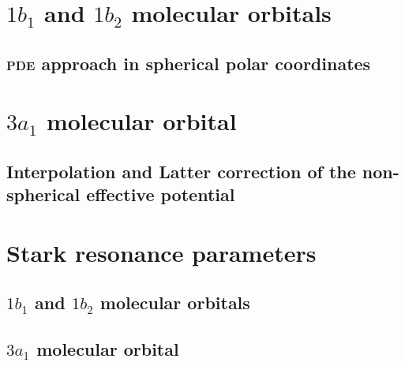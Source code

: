 
\section{$1b_{1}$ and $1b_{2}$ molecular orbitals}
\label{ch:1b1_1b2}
\subsection{\textsc{pde} approach in spherical polar coordinates}

\section{$3a_{1}$ molecular orbital}
\label{ch:3a1}
\subsection{Interpolation and Latter correction of the
  non-spherical effective potential}




\section{Stark resonance parameters}
\label{ch:stark_params}
\subsection{$1b_{1}$ and $1b_{2}$ molecular orbitals}
\subsection{$3a_{1}$ molecular orbital}

